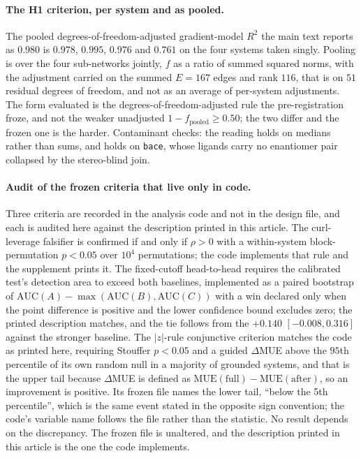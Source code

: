 \paragraph{The H1 criterion, per system and as pooled.} The pooled degrees-of-freedom-adjusted
gradient-model $R^2$ the main text reports as $0.980$ is $0.978$, $0.995$, $0.976$ and $0.761$ on
the four systems taken singly. Pooling is over the four sub-networks jointly, $f$ as a ratio of
summed squared norms, with the adjustment carried on the summed $E=167$ edges and rank $116$, that
is on $51$ residual degrees of freedom, and not as an average of per-system adjustments. The form
evaluated is the degrees-of-freedom-adjusted rule the pre-registration froze, and not the weaker
unadjusted $1-f_{\text{pooled}}\geq0.50$; the two differ and the frozen one is the harder.
Contaminant checks: the reading holds on medians rather than sums, and holds on \texttt{bace},
whose ligands carry no enantiomer pair collapsed by the stereo-blind join.

\paragraph{Audit of the frozen criteria that live only in code.} Three criteria are recorded in the
analysis code and not in the design file, and each is audited here against the description printed
in this article. The
curl-leverage falsifier is confirmed if and only if $\rho>0$ with a within-system block-permutation
$p<0.05$ over $10^4$ permutations; the code implements that rule and the supplement prints it. The fixed-cutoff head-to-head requires the calibrated test's detection area to exceed
both baselines, implemented as a paired bootstrap of
$\mathrm{AUC}(A)-\max(\mathrm{AUC}(B),\mathrm{AUC}(C))$ with a win declared only when the point
difference is positive and the lower confidence bound excludes zero; the printed description
matches, and the tie follows from the $+0.140$ $[-0.008,0.316]$ against the stronger baseline. The
$|z|$-rule conjunctive criterion matches the code as printed here, requiring Stouffer $p<0.05$ and
a guided $\Delta$MUE above the $95$th percentile of its own random null in a majority of grounded
systems, and that is the upper tail because $\Delta$MUE is defined as
$\mathrm{MUE}(\text{full})-\mathrm{MUE}(\text{after})$, so an improvement is positive. Its frozen
file names the lower tail, ``below the 5th percentile'', which is the same event stated in the
opposite sign convention; the code's variable name follows the file rather than the statistic. No
result depends on the discrepancy. The frozen file is unaltered, and the description printed in
this article is the one the code implements.


